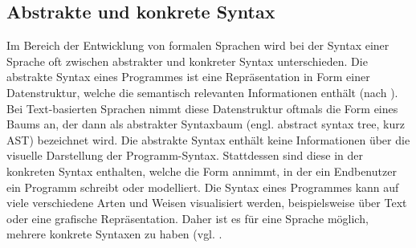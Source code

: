 \subsection{Abstrakte und konkrete Syntax}
Im Bereich der Entwicklung von formalen Sprachen wird bei der Syntax einer Sprache oft zwischen abstrakter und konkreter Syntax unterschieden. Die abstrakte Syntax eines Programmes ist eine Repräsentation in Form einer Datenstruktur, welche die semantisch relevanten Informationen enthält (nach \cite[S. 26]{Voelter:13}). Bei Text-basierten Sprachen nimmt diese Datenstruktur oftmals die Form eines Baums an, der dann als abstrakter Syntaxbaum (engl. abstract syntax tree, kurz AST) bezeichnet wird. Die abstrakte Syntax enthält keine Informationen über die visuelle Darstellung der Programm-Syntax. Stattdessen sind diese in der konkreten Syntax enthalten, welche die Form annimmt, in der ein Endbenutzer ein Programm schreibt oder modelliert. Die Syntax eines Programmes kann auf viele verschiedene Arten und Weisen visualisiert werden, beispielsweise über Text oder eine grafische Repräsentation. Daher ist es für eine Sprache möglich, mehrere konkrete Syntaxen zu haben (vgl. \cite[S. 6f]{Kleppe:09}.